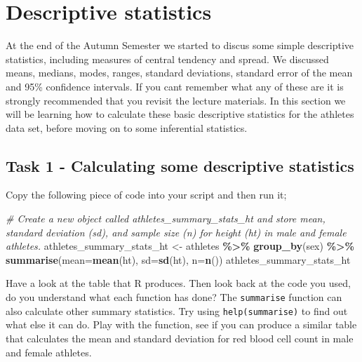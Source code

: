 \documentclass[
]{book}
\newenvironment{Shaded}{\begin{snugshade}}{\end{snugshade}}
\newcommand{\AttributeTok}[1]{\textcolor[rgb]{0.13,0.29,0.53}{#1}}
\newcommand{\CommentTok}[1]{\textcolor[rgb]{0.56,0.35,0.01}{\textit{#1}}}
\newcommand{\FunctionTok}[1]{\textcolor[rgb]{0.13,0.29,0.53}{\textbf{#1}}}
\newcommand{\NormalTok}[1]{#1}
\newcommand{\OtherTok}[1]{\textcolor[rgb]{0.56,0.35,0.01}{#1}}
\newcommand{\SpecialCharTok}[1]{\textcolor[rgb]{0.81,0.36,0.00}{\textbf{#1}}}
\begin{document}
\hypertarget{descriptive-statistics}{%
\section{Descriptive statistics}\label{descriptive-statistics}}

At the end of the Autumn Semester we started to discus some simple descriptive statistics, including measures of central tendency and spread. We discussed means, medians, modes, ranges, standard deviations, standard error of the mean and 95\% confidence intervals. If you cant remember what any of these are it is strongly recommended that you revisit the lecture materials. In this section we will be learning how to calculate these basic descriptive statistics for the athletes data set, before moving on to some inferential statistics.

\hypertarget{task-1---calculating-some-descriptive-statistics}{%
\subsection{Task 1 - Calculating some descriptive statistics}\label{task-1---calculating-some-descriptive-statistics}}

Copy the following piece of code into your script and then run it;

\begin{Shaded}
\begin{Highlighting}[]
\CommentTok{\# Create a new object called athletes\_summary\_stats\_ht and store mean, standard deviation (sd), and sample size (n) for height (ht) in male and female athletes.}
\NormalTok{athletes\_summary\_stats\_ht }\OtherTok{\textless{}{-}}\NormalTok{ athletes }\SpecialCharTok{\%\textgreater{}\%} 
  \FunctionTok{group\_by}\NormalTok{(sex) }\SpecialCharTok{\%\textgreater{}\%} 
  \FunctionTok{summarise}\NormalTok{(}\AttributeTok{mean=}\FunctionTok{mean}\NormalTok{(ht),}
            \AttributeTok{sd=}\FunctionTok{sd}\NormalTok{(ht),}
            \AttributeTok{n=}\FunctionTok{n}\NormalTok{())}
\NormalTok{athletes\_summary\_stats\_ht}
\end{Highlighting}
\end{Shaded}

Have a look at the table that R produces. Then look back at the code you used, do you understand what each function has done? The \texttt{summarise} function can also calculate other summary statistics. Try using \texttt{help(summarise)} to find out what else it can do. Play with the function, see if you can produce a similar table that calculates the mean and standard deviation for red blood cell count in male and female athletes.
\end{document}
